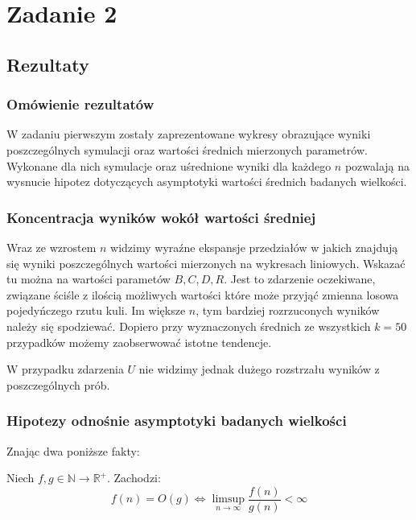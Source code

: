 \documentclass{article}
\newenvironment{fact}[1]{%
    \trivlist
    \item[\hskip\labelsep\textbf{Fakt. #1.}]
    \ignorespaces
}{%
    \endtrivlist
}
\begin{document}
\section{Zadanie 2}

\subsection{Rezultaty}

\subsubsection{Omówienie rezultatów}

W zadaniu pierwszym zostały zaprezentowane wykresy obrazujące wyniki poszczególnych symulacji oraz wartości średnich mierzonych parametrów. Wykonane dla nich symulacje oraz uśrednione wyniki dla każdego $n$ pozwalają na wysnucie hipotez dotyczących asymptotyki wartości średnich badanych wielkości.

\subsubsection{Koncentracja wyników wokół wartości średniej}

Wraz ze wzrostem $n$ widzimy wyraźne ekspansje przedziałów w jakich znajdują się wyniki poszczególnych wartości mierzonych na wykresach liniowych. Wskazać tu można na wartości parametów $B, C, D, R$. Jest to zdarzenie oczekiwane, związane ściśle z ilością możliwych wartości które może przyjąć zmienna losowa pojedyńczego rzutu kuli. Im większe $n$, tym bardziej rozrzuconych wyników należy się spodziewać. Dopiero przy wyznaczonych średnich ze wszystkich $k=50$ przypadków możemy zaobserwować istotne tendencje.

W przypadku zdarzenia $U$ nie widzimy jednak dużego rozstrzału wyników z poszczególnych prób.

\subsubsection{Hipotezy odnośnie asymptotyki badanych wielkości}

Znając dwa poniższe fakty:

\begin{fact}{Big O Limit}
    Niech $f,g \in\mathbb{N}\rightarrow\mathbb{R}^{+}$. Zachodzi:
    \[f(n)=O(g) \iff \limsup_{n\rightarrow\infty} \frac{f(n)}{g(n)} < \infty\]
\end{fact}
\end{document}
